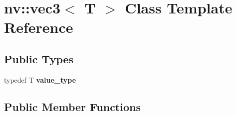 \hypertarget{classnv_1_1vec3}{}\section{nv\+:\+:vec3$<$ T $>$ Class Template Reference}
\label{classnv_1_1vec3}
\subsection*{Public Types}
\begin{DoxyCompactItemize}
\item 
\hypertarget{classnv_1_1vec3_ac9b2ba01240d87192bbdd37f52979cb7}{}\label{classnv_1_1vec3_ac9b2ba01240d87192bbdd37f52979cb7} 
typedef T {\bfseries value\+\_\+type}
\end{DoxyCompactItemize}
\subsection*{Public Member Functions}
